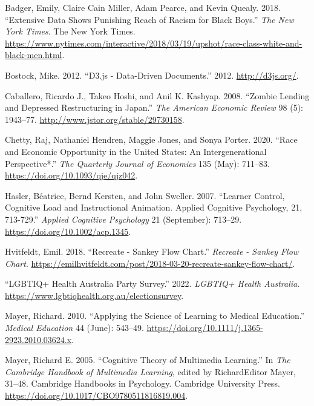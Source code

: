 \hypertarget{refs}{}
\begin{CSLReferences}{1}{0}
\leavevmode{}%
Badger, Emily, Claire Cain Miller, Adam Pearce, and Kevin Quealy. 2018. {``Extensive Data Shows Punishing Reach of Racism for Black Boys.''} \emph{The New York Times}. The New York Times. \url{https://www.nytimes.com/interactive/2018/03/19/upshot/race-class-white-and-black-men.html}.

\leavevmode{}%
Bostock, Mike. 2012. {``D3.js - Data-Driven Documents.''} 2012. \url{http://d3js.org/}.

\leavevmode{}%
Caballero, Ricardo J., Takeo Hoshi, and Anil K. Kashyap. 2008. {``Zombie Lending and Depressed Restructuring in {J}apan.''} \emph{The American Economic Review} 98 (5): 1943--77. \url{http://www.jstor.org/stable/29730158}.

\leavevmode{}%
Chetty, Raj, Nathaniel Hendren, Maggie Jones, and Sonya Porter. 2020. {``Race and Economic Opportunity in the United States: An Intergenerational Perspective*.''} \emph{The Quarterly Journal of Economics} 135 (May): 711--83. \url{https://doi.org/10.1093/qje/qjz042}.

\leavevmode{}%
Hasler, Béatrice, Bernd Kersten, and John Sweller. 2007. {``Learner Control, Cognitive Load and Instructional Animation. Applied Cognitive Psychology, 21, 713-729.''} \emph{Applied Cognitive Psychology} 21 (September): 713--29. \url{https://doi.org/10.1002/acp.1345}.

\leavevmode{}%
Hvitfeldt, Emil. 2018. {``Recreate - Sankey Flow Chart.''} \emph{Recreate - Sankey Flow Chart}. \url{https://emilhvitfeldt.com/post/2018-03-20-recreate-sankey-flow-chart/}.

\leavevmode{}%
{``LGBTIQ+ Health Australia Party Survey.''} 2022. \emph{LGBTIQ+ Health Australia}. \url{https://www.lgbtiqhealth.org.au/electionsurvey}.

\leavevmode{}%
Mayer, Richard. 2010. {``Applying the Science of Learning to Medical Education.''} \emph{Medical Education} 44 (June): 543--49. \url{https://doi.org/10.1111/j.1365-2923.2010.03624.x}.

\leavevmode{}%
Mayer, Richard E. 2005. {``Cognitive Theory of Multimedia Learning.''} In \emph{The Cambridge Handbook of Multimedia Learning}, edited by RichardEditor Mayer, 31--48. Cambridge Handbooks in Psychology. Cambridge University Press. \url{https://doi.org/10.1017/CBO9780511816819.004}.


\end{CSLReferences}
